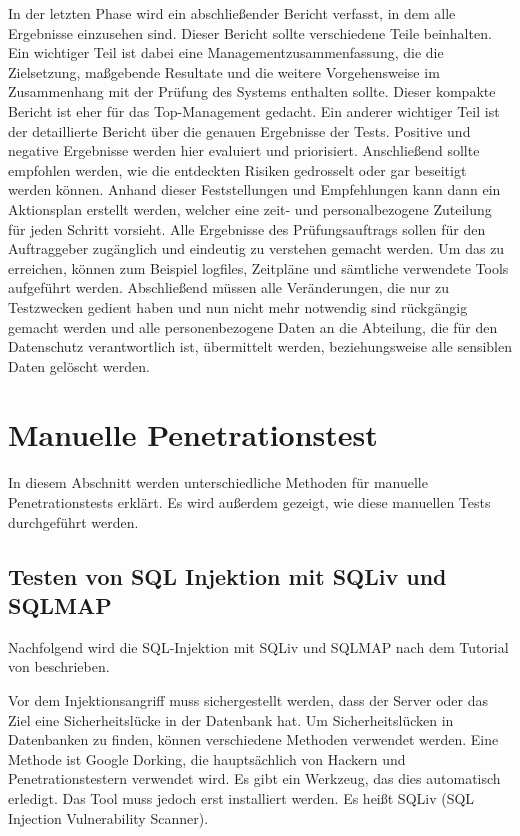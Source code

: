 In der letzten Phase wird ein abschließender Bericht verfasst, in dem alle Ergebnisse einzusehen sind. Dieser Bericht sollte verschiedene Teile beinhalten. Ein wichtiger Teil ist dabei eine Managementzusammenfassung, die die Zielsetzung, maßgebende Resultate und die weitere Vorgehensweise im Zusammenhang mit der Prüfung des Systems enthalten sollte. Dieser kompakte Bericht ist eher für das Top-Management gedacht.
Ein anderer wichtiger Teil ist der detaillierte Bericht über die genauen Ergebnisse der Tests. Positive und negative Ergebnisse werden hier evaluiert und priorisiert. Anschließend sollte empfohlen werden, wie die entdeckten Risiken gedrosselt oder gar beseitigt werden können. Anhand dieser Feststellungen und Empfehlungen kann dann ein Aktionsplan erstellt werden, welcher eine zeit- und personalbezogene Zuteilung für jeden Schritt vorsieht. Alle Ergebnisse des Prüfungsauftrags sollen für den Auftraggeber zugänglich und eindeutig zu verstehen gemacht werden. Um das zu erreichen, können zum Beispiel logfiles, Zeitpläne und sämtliche verwendete Tools aufgeführt werden. Abschließend müssen alle Veränderungen, die nur zu Testzwecken gedient haben und nun nicht mehr notwendig sind rückgängig gemacht werden und alle personenbezogene Daten an die Abteilung, die für den Datenschutz verantwortlich ist, übermittelt werden, beziehungsweise alle sensiblen Daten gelöscht werden\cite[105--106]{pt03bsi}.

\newpage

\section{Manuelle Penetrationstest}

In diesem Abschnitt werden unterschiedliche Methoden für manuelle Penetrationstests erklärt. Es wird außerdem gezeigt, wie diese manuellen Tests durchgeführt werden.

\subsection{Testen von SQL Injektion mit SQLiv und SQLMAP}

Nachfolgend wird die SQL-Injektion mit SQLiv und SQLMAP nach dem Tutorial von \cite{ramadhan17sqlinj} beschrieben.

Vor dem Injektionsangriff muss sichergestellt werden, dass der Server oder das Ziel eine Sicherheitslücke in der Datenbank hat. Um Sicherheitslücken in Datenbanken zu finden, können verschiedene Methoden verwendet werden. Eine Methode ist Google Dorking, die hauptsächlich von Hackern und Penetrationstestern verwendet wird. Es gibt ein Werkzeug, das dies automatisch erledigt. Das Tool muss jedoch erst installiert werden. Es heißt SQLiv (SQL Injection Vulnerability Scanner).\\

